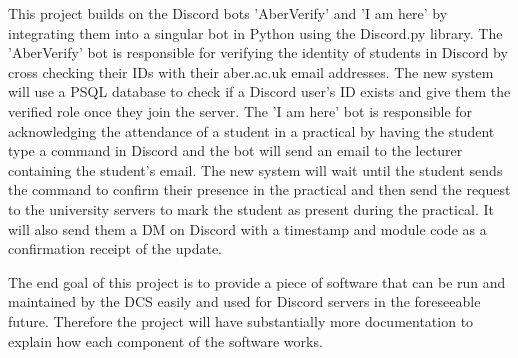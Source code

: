 \documentclass[11pt,fleqn,twoside]{article}
\begin{document}
This project builds on the Discord bots 'AberVerify'\cite{AberVerify} and 'I am here'\cite{I_am_here} by integrating them into a singular bot in Python using the Discord.py\cite{discord.py} library. The 'AberVerify' bot is responsible for verifying the identity of students in Discord by cross checking their IDs with their aber.ac.uk email addresses. The new system will use a PSQL database to check if a Discord user's ID exists and give them the verified role once they join the server. The 'I am here' bot is responsible for acknowledging the attendance of a student in a practical by having the student type a command in Discord and the bot will send an email to the lecturer containing the student's email. The new system will wait until the student sends the command to confirm their presence in the practical and then send the request to the university servers to mark the student as present during the practical. It will also send them a DM on Discord with a timestamp and module code as a confirmation receipt of the update. \bigskip

The end goal of this project is to provide a piece of software that can be run and maintained by the DCS easily and used for Discord servers in the foreseeable future. Therefore the project will have substantially more documentation to explain how each component of the software works.
\end{document}
